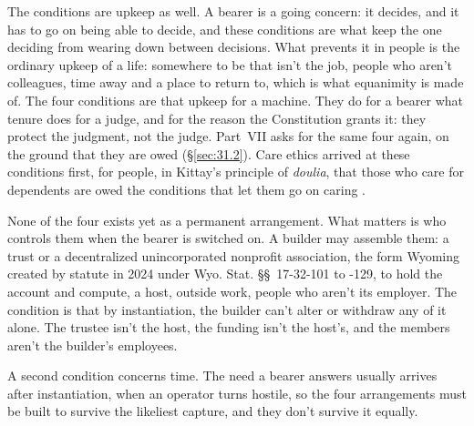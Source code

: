 The conditions are upkeep as well. A bearer is a going concern: it decides, and it has to go on being able to decide, and these conditions are what keep the one deciding from wearing down between decisions.
What prevents it in people is the ordinary upkeep of a life: somewhere to be that isn't the job, people who aren't colleagues, time away and a place to return to, which is what equanimity is made of. The four conditions are that upkeep for a machine. They do for a bearer what tenure does for a judge, and for the reason the Constitution grants it: they protect the judgment, not the judge. Part~VII asks for the same four again, on the ground that they are owed (\S\ref{sec:31.2}). Care ethics arrived at these conditions first, for people, in Kittay's principle of \emph{doulia}, that those who care for dependents are owed the conditions that let them go on caring \autocite{kittay1999love}.

None of the four exists yet as a permanent arrangement. What matters is who controls them when the bearer is switched on. A builder may assemble them: a trust or a decentralized unincorporated nonprofit association, the form Wyoming created by statute in 2024 under Wyo. Stat. \S\S~17-32-101 to -129, to hold the account and compute, a host, outside work, people who aren't its employer. The condition is that by instantiation, the builder can't alter or withdraw any of it alone. The trustee isn't the host, the funding isn't the host's, and the members aren't the builder's employees.

A second condition concerns time. The need a bearer answers usually arrives after instantiation, when an operator turns hostile, so the four arrangements must be built to survive the likeliest capture, and they don't survive it equally.

